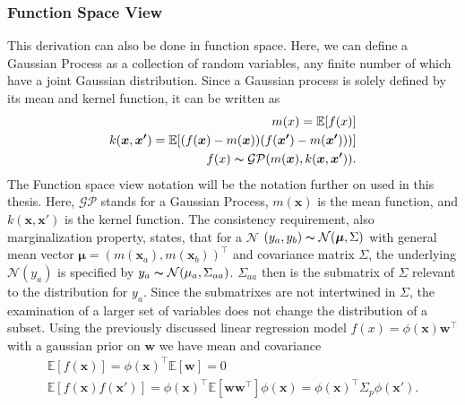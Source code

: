 \subsubsection{Function Space View}
This derivation can also be done in function space. Here, we can define a Gaussian Process as a collection of random variables, any finite number of which have a joint Gaussian distribution. Since a Gaussian process is solely defined by its mean and kernel function, it can be written as
\begin{subequations}%
	\label{eq:Gaussian_process_function_space_view}
	\begin{align}
	m(x) =\mathbb{E}[f(x)]         \label{eq:function space view mean} \\
	k(\bm{x},\bm{x'}) = \mathbb{E}[(f(\bm{x})-m(\bm{x}))(f(\bm{x'})-m(\bm{x'})))]         \label{eq:function space view covariance function} \\
	f(x) \thicksim \mathcal{GP}(m(\bm{x}), k(\bm{x}, \bm{x'})).               \label{fuinction space view gaussian process}
	\end{align}
\end{subequations}
The Function space view notation will be the notation further on used in this thesis. Here, $\mathcal{GP}$ stands for a Gaussian Process, $m(\bm{x})$ is the mean function, and $k(\bm{x}, \bm{x'})$ is the kernel function. The consistency requirement, also marginalization property, states, that for a $\mathcal{N}$ $(y_a, y_b) \thicksim \mathcal{N}(\bm{\mu}, \Sigma)$ with general mean vector $\bm{\mu} = (m(\bm{x}_a), m(\bm{x}_b))^{\top}$ and covariance matrix $\Sigma$, the underlying $\mathcal{N}(y_a)$ is specified by $y_a \thicksim \mathcal{N}(\mu_a, \Sigma_{aa})$. $\Sigma_{aa}$ then is the submatrix of $\Sigma$ relevant to the distribution for $y_a$. Since the submatrixes are not intertwined in $\Sigma$, the examination of a larger set of variables does not change the distribution of a subset. Using the previously discussed linear regression model $f(x) = \phi(\bm{x})\bm{w}^{\top}$ with a gaussian prior on $\bm{w}$ we have mean and covariance
\begin{subequations}%
	\label{eq:Function space view linear regression mean and covariance}
	\begin{align}
	\mathbb{E}[f(\bm{x})] = \phi(\bm{x})^{\top} \mathbb{E}[\bm{w}] = 0         \label{eq:function space linear mean} \\
	\mathbb{E}[f(\bm{x})f(\bm{x'})] = \phi(\bm{x})^{\top} \mathbb{E}[\bm{w}\bm{w}^{\top}]\phi(\bm{x}) = \phi(\bm{x})^{\top}\Sigma_p\phi(\bm{x'}).         \label{eq:function space linear covariance}
	\end{align}
\end{subequations}
